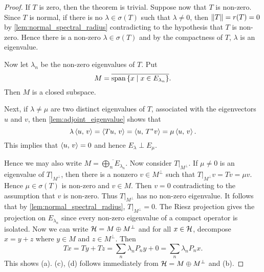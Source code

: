 \begin{proof}
    If $T$ is zero, then the theorem is trivial. Suppose now that 
    $T$ is non-zero. Since $T$ is normal, if there is no $\lambda\in\sigma(T)$ 
    such that $\lambda\neq 0$, then $\left\lVert {T} \right\rVert = r(T) = 0$ by 
    \cref{lem:normal_spectral_radius} contradicting to the hypothesis that $T$ 
    is non-zero. Hence there is a non-zero $\lambda\in\sigma(T)$ and 
    by the compactness of $T$, $\lambda$ is an eigenvalue. 

    Now let $\lambda_n$ be the non-zero eigenvalues of $T$. Put 
    \begin{equation*}
        M = \overline{\operatorname{span}\left\{ x \;\middle\vert\; x\in E_{\lambda_n} \right\}}.
    \end{equation*}
    Then $M$ is a closed subspace. 

    Next, if $\lambda\neq\mu$ are two distinct eigenvalues of $T$, associated with 
    the eigenvectors $u$ and $v$, then \cref{lem:adjoint_eigenvalue} shows that
    \begin{equation*}
        \lambda\left\langle {u},\, {v} \right\rangle = \left\langle {Tu},\, {v} \right\rangle = \left\langle {u},\, {T^*v} \right\rangle = \mu\left\langle {u},\, {v} \right\rangle.
    \end{equation*}
    This implies that $\left\langle {u},\, {v} \right\rangle = 0$ and hence $E_\lambda\perp E_\mu$. 

    Hence we may also write $M = \overline{\bigoplus_n E_{\lambda_n}}$. 
    Now consider $T|_{M^\perp}$. If $\mu\neq 0$ is an eigenvalue of 
    $T|_{M^\perp}$, then there is a nonzero $v\in M^\perp$ such that 
    $T|_{M^\perp}v = Tv = \mu v$. Hence $\mu\in\sigma(T)$ is non-zero 
    and $v \in M$. Then $v = 0$ contradicting to the assumption that $v$ is non-zero. 
    Thus $T|_{M^\perp}$ has no non-zero eigenvalue. It follows that 
    by \cref{lem:normal_spectral_radius}, $T|_{M^\perp} = 0$. The 
    Riesz projection gives the projection on $E_{\lambda_n}$ since 
    every non-zero eigenvalue of a compact operator is isolated. 
    Now we can write $\mathcal{H} = M\oplus M^\perp$ and for all $x\in\mathcal{H}$, 
    decompose $x = y + z$ where $y\in M$ and $z\in M^\perp$. 
    Then 
    \begin{equation*}
        Tx = Ty + Tz = \sum_n \lambda_n P_ny + 0 = \sum_n \lambda_n P_nx.
    \end{equation*}
    This shows (a). (c), (d) follows immediately from $\mathcal{H} = M\oplus M^\perp$ 
    and (b). 
\end{proof}
